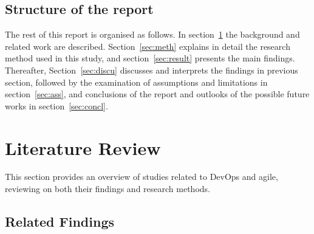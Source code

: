 \documentclass[
  12pt,
  a4paper,
]{article}
\begin{document}
\hypertarget{structure-of-the-report}{%
\subsection{Structure of the report}\label{structure-of-the-report}}

The rest of this report is organised as follows. In
section~\ref{sec:liter} the background and related work are described.
Section~\ref{sec:meth} explains in detail the research method used in
this study, and section~\ref{sec:result} presents the main findings.
Thereafter, Section~\ref{sec:discu} discusses and interprets the
findings in previous section, followed by the examination of assumptions
and limitations in section~\ref{sec:ass}, and conclusions of the report
and outlooks of the possible future works in section~\ref{sec:concl}.

\hypertarget{sec:liter}{%
\section{Literature Review}\label{sec:liter}}

This section provides an overview of studies related to DevOps and
agile, reviewing on both their findings and research methods.

\hypertarget{related-findings}{%
\subsection{Related Findings}\label{related-findings}}
\end{document}
